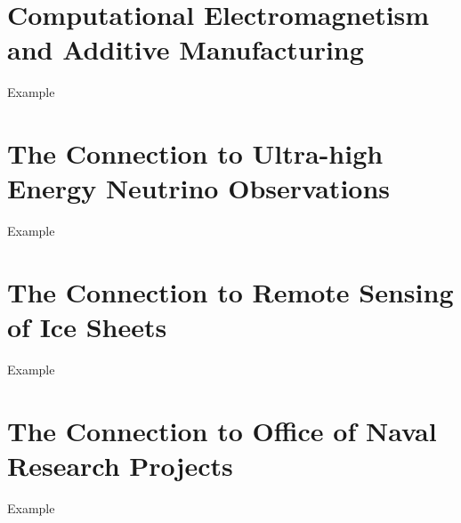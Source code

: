 \documentclass[../../main.tex]{subfiles}
\begin{document}
\section{Computational Electromagnetism and Additive Manufacturing}

Example

\section{The Connection to Ultra-high Energy Neutrino Observations}

Example

\section{The Connection to Remote Sensing of Ice Sheets}

Example

\section{The Connection to Office of Naval Research Projects}

Example
\end{document}
